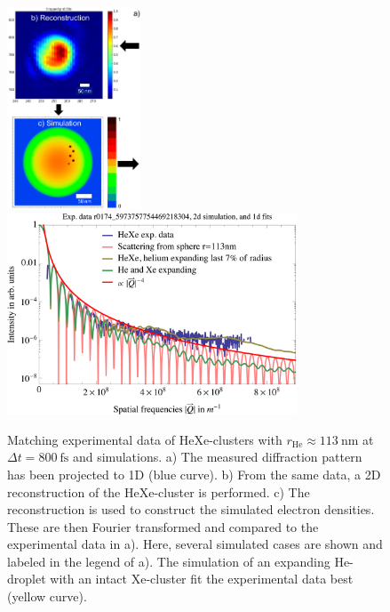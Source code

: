 \begin{figure}
	\centering
		\includegraphics[height=6.0cm]{images/results/HeXe-densities-113-05-doping-and-reconstruction-1.png}
		\includegraphics[height=6.0cm]{images/results/HeXe-cluster-113-0-5-doping2.png}
	\caption[Simulation and exp. data: Structural damage in He-droplet.]{Matching experimental data of HeXe-clusters with $r_{\text{He}}\approx \SI{113}{\nano\meter}$ at $\Delta t=\SI{800}{\femto\second}$ and simulations. a) The measured diffraction pattern has been projected to 1D (blue curve). b) From the same data, a 2D reconstruction of the HeXe-cluster is performed. c) The reconstruction is used to construct the simulated electron densities. These are then Fourier transformed and compared to the experimental data in a). Here, several simulated cases are shown and labeled in the legend of a). The simulation of an expanding He-droplet with an intact Xe-cluster fit the experimental data best (yellow curve).}
	\label{fig:HeXe-cluster-113-0.5}
\end{figure}
